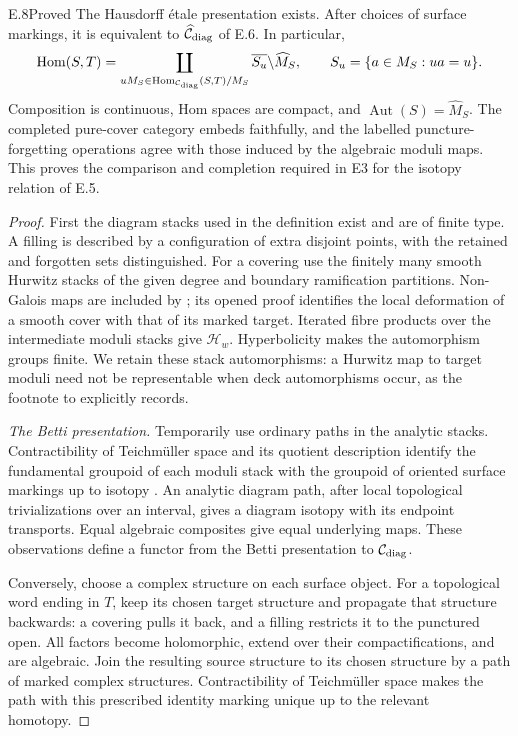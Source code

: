 \begin{claim}{E.8}{Proved}
The Hausdorff \'etale presentation exists. After choices of
surface markings, it is equivalent to
$\widehat{\mathcal C}_{\rm diag}$ of E.6. In particular,
\[
 \operatorname{Hom}(S,T)=
 \coprod_{uM_S\in\operatorname{Hom}_{\mathcal C_{\rm diag}}(S,T)/M_S}
       \overline{S_u}\backslash\widehat M_S,
 \qquad S_u=\{a\in M_S:ua=u\}.
\]
Composition is continuous, Hom spaces are compact, and
$\operatorname{Aut}(S)=\widehat M_S$. The completed pure-cover
category embeds faithfully, and the labelled puncture-forgetting
operations agree with those induced by the algebraic moduli maps.
This proves the comparison and completion required in E3 for
the isotopy relation of E.5.
\end{claim}
\begin{proof}
First the diagram stacks used in the definition exist and are
of finite type. A filling is described by a configuration of
extra disjoint points, with the retained and forgotten sets
distinguished. For a covering use the finitely many smooth
Hurwitz stacks of the given degree and boundary ramification
partitions. Non-Galois maps are included by
\citet[Theorem~6.20]{E_BR2007}; its opened proof identifies
the local deformation of a smooth cover with that of its
marked target. Iterated fibre products over the intermediate
moduli stacks give $\mathcal H_w$. Hyperbolicity makes the
automorphism groups finite. We retain these stack automorphisms:
a Hurwitz map to target moduli need not be representable when
deck automorphisms occur, as the footnote to
\citet[Proposition~6.14]{E_BR2007} explicitly records.

\emph{The Betti presentation.}
Temporarily use ordinary paths in the analytic stacks.
Contractibility of Teichm\"uller space and its quotient
description identify the fundamental groupoid of each moduli
stack with the groupoid of oriented surface markings up to
isotopy \citep[\S2.1]{F_Schneps2003}.
An analytic diagram path, after local topological trivializations
over an interval, gives a diagram isotopy with its endpoint
transports. Equal algebraic composites give equal underlying
maps. These observations define a functor from the Betti
presentation to $\mathcal C_{\rm diag}$.

Conversely, choose a complex structure on each surface object.
For a topological word ending in $T$, keep its chosen target
structure and propagate that structure backwards: a covering
pulls it back, and a filling restricts it to the punctured open.
All factors become holomorphic, extend over their compactifications,
and are algebraic. Join the resulting source structure to its
chosen structure by a path of marked complex structures.
Contractibility of Teichm\"uller space makes the path with
this prescribed identity marking unique up to the relevant
homotopy.


\end{proof}
